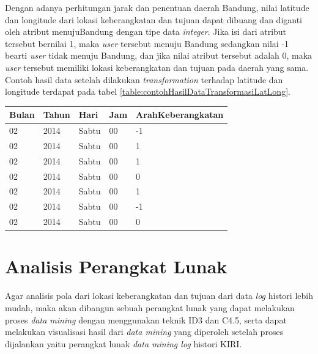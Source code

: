 Dengan adanya perhitungan jarak dan penentuan daerah Bandung, nilai latitude dan longitude dari lokasi keberangkatan dan tujuan dapat dibuang dan diganti oleh atribut menujuBandung dengan tipe data \textsl{integer}. Jika isi dari atribut tersebut bernilai 1, maka \textsl{user} tersebut menuju Bandung sedangkan nilai -1 bearti \textsl{user} tidak menuju Bandung, dan jika nilai atribut tersebut adalah 0, maka \textsl{user} tersebut memiliki lokasi keberangkatan dan tujuan pada daerah yang sama. Contoh hasil data setelah dilakukan \textsl{transformation} terhadap latitude dan longitude terdapat pada tabel \ref{table:contohHasilDataTransformasiLatLong}.

\begin{table}[H]
\centering
\caption{Contoh hasil data transformasi latitude longitude}
\label{table:contohHasilDataTransformasiLatLong}
\begin{longtable}{|l|l|l|l|l|}
\hline
\textbf{Bulan}	& \textbf{Tahun} 	& \textbf{Hari} & \textbf{Jam}	& \textbf{ArahKeberangkatan} \\ \hline
02								& 2014						& Sabtu         & 00         	& -1                    \\ \hline
02								& 2014						& Sabtu         & 00         	& 1        					  \\ \hline
02								& 2014						& Sabtu         & 00         	& 1       							\\ \hline
02								& 2014						& Sabtu         & 00         	& 0         						\\ \hline
02								& 2014						& Sabtu         & 00         	& 1          					\\ \hline
02								& 2014						& Sabtu         & 00         	& -1      							\\ \hline
02								& 2014						& Sabtu         & 00         	& 0       							\\ \hline
\end{longtable}
\end{table} 


\section{Analisis Perangkat Lunak}
Agar analisis pola dari lokasi keberangkatan dan tujuan dari data \textsl{log} histori lebih mudah, maka akan dibangun sebuah perangkat lunak yang dapat melakukan proses \textsl{data mining} dengan menggunakan teknik ID3 dan C4.5, serta dapat melakukan visualisasi hasil dari \textsl{data mining} yang diperoleh setelah proses dijalankan yaitu perangkat lunak \textsl{data mining log} histori KIRI. 

